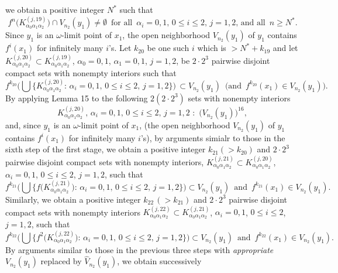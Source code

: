 \documentclass[12pt]{article}
\newcommand{\al}{\alpha}
\begin{document}
we obtain a positive integer $N^*$ such that 
$$
f^n\big(K_{\al_0\al_1\al_2}^{(j,19)}\big) \cap V_{n_2}(y_1) \ne \emptyset \,\,\, \text{for all} \,\,\, \al_i = 0, 1, \, 0 \le i \le 2, \, j = 1, 2, \, \text{and all} \,\,\, n \ge N^*.
$$
\indent Since $y_1$ is an $\omega$-limit point of $x_1$, the open neighborhood $V_{n_2}(y_1)$ of $y_1$ contains $f^i(x_1)$ for infinitely many $i$'s.  Let $k_{20}$ be one such $i$ which is $> N^*+k_{19}$ and let $K_{\al_0\al_1\al_2}^{(j,20)} \subset K_{\al_0\al_1\al_2}^{(j,19)}$, $\al_0 = 0, 1$, $\al_1 = 0, 1$, $j = 1, 2$, be $2 \cdot 2^3$ pairwise disjoint compact sets with nonempty interiors such that 
$$
f^{k_{20}}\bigg(\bigcup \big\{ K_{\al_0\al_1\al_2}^{(j,20)}: \, \al_i = 0, 1, \, 0 \le i \le 2, \, j = 1, 2 \big\}\bigg) \, \subset V_{n_2}(y_1) \,\,\, \big(\text{and} \,\,\, f^{k_{20}}(x_1) \in V_{n_2}(y_1)\big).
$$
\indent By applying Lemma 15 to the following $2(2 \cdot 2^3)$ sets with nonempty interiors 
$$
K_{\al_0\al_1\al_2}^{(j,20)}, \, \al_i = 0, 1, \, 0 \le i \le 2, \, j = 1, 2 \,\, : \,\, \big(V_{n_2}(y_1)\big)^{16},
$$
and, since $y_1$ is an $\omega$-limit point of $x_1$, \big(the open neighborhood $V_{n_2}(y_1)$ of $y_1$ contains $f^i(x_1)$ for infinitely many $i$'s\big), by arguments simialr to those in the sixth step of the first stage, we obtain a positive integer $k_{21} (> k_{20})$ and $2 \cdot 2^3$ pairwise disjoint compact sets with nonempty interiors, $K_{\al_0\al_1\al_2}^{(j,21)} \subset K_{\al_0\al_1\al_2}^{(j,20)}$, $\al_i = 0, 1$, $0 \le i \le 2$, $j = 1, 2$, such that 
$$
f^{k_{21}}\bigg(\bigcup \big\{ f\big(K_{\al_0\al_1\al_2}^{(j,21)}\big): \, \al_i = 0, 1, \, 0 \le i \le 2, \, j = 1, 2 \big\}\bigg) \subset V_{n_2}(y_1) \,\,\, \text{and} \,\,\, f^{k_{21}}(x_1) \in V_{n_2}(y_1).
$$
\indent Similarly, we obtain a positive integer $k_{22} \, (> k_{21})$ and $2 \cdot 2^3$ pairwise disjoint compact sets with nonempty interiors $K_{\al_0\al_1\al_2}^{(j,22)} \subset K_{\al_0\al_1\al_2}^{(j,21)}$, $\al_i = 0, 1$, $0 \le i \le 2$, $j = 1, 2$, such that 
$$
f^{k_{22}}\bigg(\bigcup \big\{ f^2\big(K_{\al_0\al_1\al_2}^{(j,22)}\big): \, \al_i = 0, 1, \, 0 \le i \le 2, \, j = 1, 2 \big\}\bigg) \subset V_{n_2}(y_1) \,\,\, \text{and} \,\,\, f^{k_{22}}(x_1) \in V_{n_2}(y_1).
$$
\indent By arguments similar to those in the previous three steps with {\it appropriate} $V_{n_2}(y_1)$ replaced by $\widehat V_{n_2}(y_1)$, we obtain successively 
\end{document}
